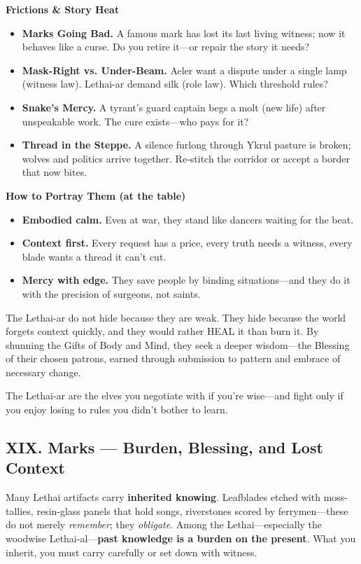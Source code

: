 \documentclass[11pt]{article}
\begin{document}
  \textbf{Frictions \& Story Heat}
  \begin{itemize}
  \item \textbf{Marks Going Bad.} A famous mark has lost its last living witness; now it behaves like a curse. Do you retire it---or repair the story it needs?
  \item \textbf{Mask-Right vs. Under-Beam.} Aeler want a dispute under a single lamp (witness law). Lethai-ar demand silk (role law). Which threshold rules?
  \item \textbf{Snake's Mercy.} A tyrant's guard captain begs a molt (new life) after unspeakable work. The cure exists---who pays for it?
  \item \textbf{Thread in the Steppe.} A silence furlong through Ykrul pasture is broken; wolves and politics arrive together. Re-stitch the corridor or accept a border that now bites.
  \end{itemize}
  
  \bigskip
  
  \textbf{How to Portray Them (at the table)}
  \begin{itemize}
  \item \textbf{Embodied calm.} Even at war, they stand like dancers waiting for the beat.
  \item \textbf{Context first.} Every request has a price, every truth needs a witness, every blade wants a thread it can't cut.
  \item \textbf{Mercy with edge.} They save people by binding situations---and they do it with the precision of surgeons, not saints.
  \end{itemize}
  
  The Lethai-ar do not hide because they are weak. They hide because the world forgets context quickly, and they would rather HEAL it than burn it. By shunning the Gifts of Body and Mind, they seek a deeper wisdom---the Blessing of their chosen patrons, earned through submission to pattern and embrace of necessary change.
  
  The Lethai-ar are the elves you negotiate with if you're wise---and fight only if you enjoy losing to rules you didn't bother to learn.
    
\subsection{XIX. Marks --- Burden, Blessing, and Lost Context}

Many Lethai artifacts carry \textbf{inherited knowing}. Leafblades etched with moss-tallies, resin-glass panels that hold songs, riverstones scored by ferrymen---these do not merely \emph{remember}; they \emph{obligate}. Among the Lethai---especially the woodwise Lethai-al---\textbf{past knowledge is a burden on the present}. What you inherit, you must carry carefully or set down with witness.
\end{document}
